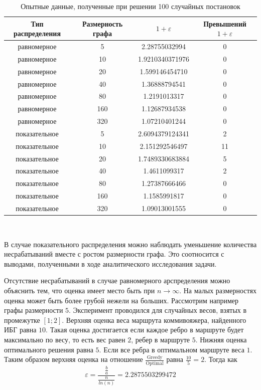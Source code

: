 \documentclass[a4paper, 14pt]{extarticle}
\numberwithin{equation}{section}
\begin{document}
\begin{table}
\caption{Опытные данные, полученные при решении 100 случайных постановок}
\begin{center}
 \begin{tabular}{||c | c | c | c||} 
 \hline
 Тип распределения & Размерность графа  & $1+\varepsilon$  & Превышений $1+\varepsilon$ \\ [0.5ex] 
 \hline\hline
 равномерное & 5 & 2.28755032994 & 0 \\ 
 \hline
 равномерное & 10 & 1.9210340371976 & 0 \\
 \hline
 равномерное & 20 & 1.599146454710 & 0 \\
 \hline
 равномерное & 40 & 1.36888794541 & 0 \\
 \hline
 равномерное & 80 & 1.2191013317 & 0 \\
 \hline
 равномерное & 160 & 1.12687934538 & 0 \\
 \hline
 равномерное & 320 & 1.07210401244 & 0 \\
 \hline
 показательное & 5 & 2.6094379124341 & 2 \\
 \hline
 показательное & 10 & 2.151292546497 & 11 \\
 \hline
 показательное & 20 & 1.7489330683884 & 5 \\ 
  \hline
 показательное & 40 & 1.4611099317 & 2 \\ 
  \hline
 показательное & 80 & 1.27387666466 & 0 \\ 
  \hline
 показательное & 160 & 1.1585991817 & 0 \\ 
 \hline
 показательное & 320 & 1.09013001555 & 0 \\[1ex] 
 \hline
\end{tabular}\\
\end{center}
\end{table}


В случае показательного распределения можно наблюдать уменьшение количества несрабатываний вместе с ростом размерности графа. Это соотносится с выводами, полученными в ходе аналитического исследования задачи. 

Отсутствие несрабатываний в случае равномерного арспределения можно объяснить тем, что оценка имеет место быть при $n \rightarrow \infty$. На малых размерностях оценка может быть более грубой нежели на больших. Рассмотрим например графы размерности $5$. Эксперимент проводился для случайных весов, взятых в промежутке $[1;2]$. Верхняя оценка веса маршрута коммивояжера, найденного ИБГ равна $10$. Такая оценка достигается если каждое ребро в маршруте будет максимально по весу, то есть вес равен $2$, ребер в маршруте $5$. Нижняя оценка оптимального решения равна $5$. Если все ребра в оптимальном маршруте веса $1$. Таким образом верхняя оценка на отношение $\frac{\mathrm{Greedy}}{\mathrm{Optimal}}$ равна $\frac{10}{5} = 2$. Тогда как
\begin{equation*}
\varepsilon = \frac{\frac{b}{a}}{\frac{n}{ln(n)}} = 2.2875503299472
\end{equation*}
\end{document}
